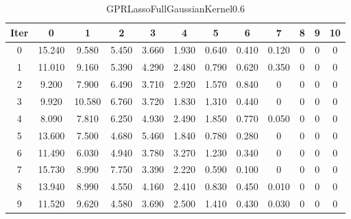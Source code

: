 \begin{table}
	\begin{center}
		\begin{tabular}{|c|c|c|c|c|c|c|c|c|c|c|c|}
			\hline
			Iter & 0 & 1 & 2 & 3 & 4 & 5 & 6 & 7 & 8 & 9 & 10 \\
			\hline
			0 & 15.240 & 9.580 & 5.450 & 3.660 & 1.930 & 0.640 & 0.410 & 0.120 & 0 & 0 & 0 \\
			\hline
			1 & 11.010 & 9.160 & 5.390 & 4.290 & 2.480 & 0.790 & 0.620 & 0.350 & 0 & 0 & 0 \\
			\hline
			2 & 9.200 & 7.900 & 6.490 & 3.710 & 2.920 & 1.570 & 0.840 & 0 & 0 & 0 & 0 \\
			\hline
			3 & 9.920 & 10.580 & 6.760 & 3.720 & 1.830 & 1.310 & 0.440 & 0 & 0 & 0 & 0 \\
			\hline
			4 & 8.090 & 7.810 & 6.250 & 4.930 & 2.490 & 1.850 & 0.770 & 0.050 & 0 & 0 & 0 \\
			\hline
			5 & 13.600 & 7.500 & 4.680 & 5.460 & 1.840 & 0.780 & 0.280 & 0 & 0 & 0 & 0 \\
			\hline
			6 & 11.490 & 6.030 & 4.940 & 3.780 & 3.270 & 1.230 & 0.340 & 0 & 0 & 0 & 0 \\
			\hline
			7 & 15.730 & 8.990 & 7.750 & 3.390 & 2.220 & 0.590 & 0.100 & 0 & 0 & 0 & 0 \\
			\hline
			8 & 13.940 & 8.990 & 4.550 & 4.160 & 2.410 & 0.830 & 0.450 & 0.010 & 0 & 0 & 0 \\
			\hline
			9 & 11.520 & 9.620 & 4.580 & 3.690 & 2.500 & 1.410 & 0.430 & 0.030 & 0 & 0 & 0 \\
			\hline
		\end{tabular}
	\end{center}
	\caption{GPRLassoFullGaussianKernel0.6}
\end{table}